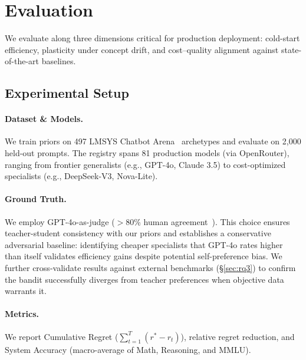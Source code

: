 
\section{Evaluation}
\label{sec:evaluation}

We evaluate \ours{} along three dimensions critical for production deployment: cold-start efficiency, plasticity under concept drift, and cost--quality alignment against state-of-the-art baselines.

\subsection{Experimental Setup}
\label{sec:experiments}

\paragraph{Dataset \& Models.} We train priors on 497 LMSYS Chatbot Arena~\cite{zheng2023judging} archetypes and evaluate on 2,000 held-out prompts. The registry spans 81 production models (via OpenRouter), ranging from frontier generalists (e.g., GPT-4o, Claude 3.5) to cost-optimized specialists (e.g., DeepSeek-V3, Nova-Lite).

\paragraph{Ground Truth.} We employ GPT-4o-as-judge ($>$80\% human agreement~\cite{zheng2023judging}). This choice ensures teacher-student consistency with our priors and establishes a conservative adversarial baseline: identifying cheaper specialists that GPT-4o rates higher than itself validates efficiency gains despite potential self-preference bias. We further cross-validate results against external benchmarks (\S\ref{sec:rq3}) to confirm the bandit successfully diverges from teacher preferences when objective data warrants it.

\paragraph{Metrics.} We report Cumulative Regret ($\sum_{t=1}^T (r^* - r_t)$), relative regret reduction, and System Accuracy (macro-average of Math, Reasoning, and MMLU).

